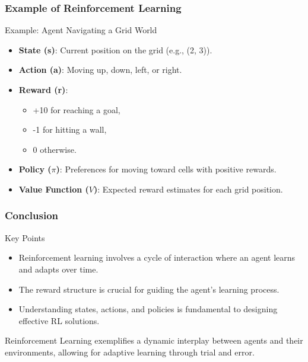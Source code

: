 \documentclass[aspectratio=169]{beamer}
\begin{document}
\begin{frame}[fragile]
    \frametitle{Example of Reinforcement Learning}
    \begin{block}{Example: Agent Navigating a Grid World}
        \begin{itemize}
            \item \textbf{State (s)}: Current position on the grid (e.g., (2, 3)).
            \item \textbf{Action (a)}: Moving up, down, left, or right.
            \item \textbf{Reward (r)}: 
            \begin{itemize}
                \item +10 for reaching a goal,
                \item -1 for hitting a wall,
                \item 0 otherwise.
            \end{itemize}
            \item \textbf{Policy ($\pi$)}: Preferences for moving toward cells with positive rewards.
            \item \textbf{Value Function ($V$)}: Expected reward estimates for each grid position.
        \end{itemize}
    \end{block}
\end{frame}

\begin{frame}[fragile]
    \frametitle{Conclusion}
    \begin{block}{Key Points}
        \begin{itemize}
            \item Reinforcement learning involves a cycle of interaction where an agent learns and adapts over time.
            \item The reward structure is crucial for guiding the agent's learning process.
            \item Understanding states, actions, and policies is fundamental to designing effective RL solutions.
        \end{itemize}
    \end{block}
    Reinforcement Learning exemplifies a dynamic interplay between agents and their environments, allowing for adaptive learning through trial and error.
\end{frame}
\end{document}
